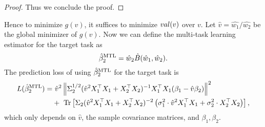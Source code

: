\begin{proof}
Thus we conclude the proof.
\end{proof}

Hence to minimize $g(v)$, it suffices to minimize $val(v)$ over $v$.
Let $\hat v=\hat{w_1}/\hat{w_2}$ be the global minimizer of $g(v)$.
Now we can define the multi-task learning estimator for the target task as
	\[ \hat{\beta}_2^{\textup{MTL}} = \hat{w}_{2}\hat{B}(\hat{w}_1, \hat{w}_2) .\]
The prediction loss of using $\hat{\beta}_2^{\textup{MTL}}$ for the target task is
\begin{align}
	L(\hat{\beta}_2^{\textup{MTL}}) =&~ \hat{v}^2 \left\| \Sigma_2^{1/2}(\hat{v}^2 X_1^{\top}X_1 + X_2^{\top}X_2)^{-1} X_1^{\top}X_1 (\beta_1 - \hat{v} \beta_2) \right\|^2 \nonumber \\
			&+~  \operatorname{Tr}\left[\Sigma_2(\hat{v}^2 X_1^{\top}X_1 + X_2^{\top}X_2)^{-2}\left(\sigma_1^2 \cdot \hat v^2  X_1^{\top}X_1 + \sigma_2^2  \cdot X_2^{\top}X_2\right) \right], \label{eq_te_mtl_2task}
\end{align}
which only depends on $\hat v$, the sample covariance matrices, and $\beta_1,\beta_2$.
\fi


